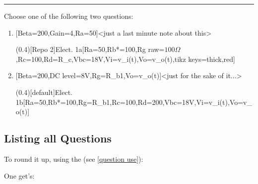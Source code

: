 \documentclass[10pt]{article}
\begin{document}

\hrule\relax\vspace{0.5ex}

Choose one of the following two questions:

\begin{enumerate}
  \item {}[Beta=200,Gain=4,Ra=50\Omega]<just a last minute note about this>\par
  \ftikzQuestion(0.4)[Repo 2]{Elect. 1a}[Ra=50\Omega,Rb*=100\Omega,Rg raw=$100\Omega$,Rc=100\Omega,Rd=R_c,Vbc=18V,Vi=v_i(t),Vo=v_o(t),tikz keys={thick,red}]
  
  \item {}[Beta=200,DC level=8V,Rg=R_{b1},Vo=v_o(t)]<just for the sake of it...>\par
  \ftikzQuestion(0.4)[default]{Elect. 1b}[Ra=50\Omega,Rb*=100\Omega,Rg=R_{b1},Rc=100\Omega,Rd=200\Omega,Vbc=18V,Vi=v_i(t),Vo=v_o(t)]
\end{enumerate}

\subsection{Listing all Questions}
To round it up, using the \tsobj{\QuestionsList} (see \ref{question use}):
\begin{codestore}[Qlist]
\QuestionsList
\end{codestore}


One get's: 

\QuestionsList
\end{document}
